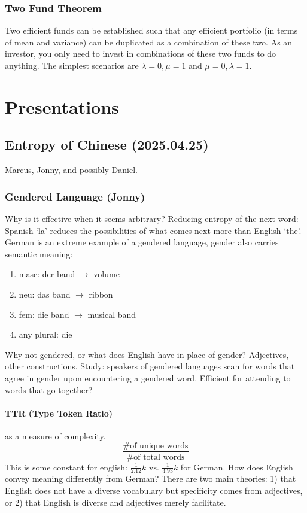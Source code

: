 \documentclass[12pt]{article}
\theoremstyle{remark}
\begin{document}
\subsubsection{Two Fund Theorem}
Two efficient funds can be established such that any efficient portfolio (in terms of mean and variance) can be duplicated as a combination of these two. As an investor, you only need to invest in combinations of these two funds to do anything. The simplest scenarios are $\lambda = 0, \mu = 1$ and $\mu = 0, \lambda = 1$.

\section{Presentations}
\subsection{Entropy of Chinese (2025.04.25)}
Marcus, Jonny, and possibly Daniel.

\subsubsection{Gendered Language (Jonny)} Why is it effective when it seems arbitrary? Reducing entropy of the next word: Spanish `la' reduces the possibilities of what comes next more than English `the'. German is an extreme example of a gendered language, gender also carries semantic meaning:
\begin{enumerate}
    \item masc: der band $\to$ volume
    \item neu: das band $\to$ ribbon
    \item fem: die band $\to$ musical band
    \item any plural: die
\end{enumerate}

Why not gendered, or what does English have in place of gender? Adjectives, other constructions. Study: speakers of gendered languages scan for words that agree in gender upon encountering a gendered word. Efficient for attending to words that go together?

\paragraph{TTR (Type Token Ratio)} as a measure of complexity. \[\frac{\text{\# of unique words}}{\text{\# of total words}}\]
This is some constant for english: $\frac{1}{2.12}k$ vs. $\frac{1}{4.93}k$ for German. How does English convey meaning differently from German? There are two main theories: 1) that English does not have a diverse vocabulary but specificity comes from adjectives, or 2) that English is diverse and adjectives merely facilitate.
\end{document}
